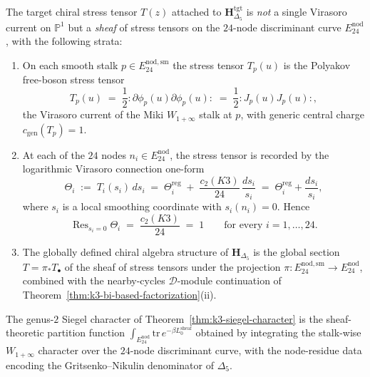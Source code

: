 \begin{conjecture}
\label{thm:k3-stress-tensor-sheaf}
\ClaimStatusConjectured
The target chiral stress tensor $T(z)$ attached to
$\mathbf{H}_{\Delta_5}^{\mathrm{tgt}}$ is \emph{not} a
single Virasoro current on $\mathbb{P}^1$ but a \emph{sheaf} of stress tensors
on the $24$-node discriminant curve $E^{\mathrm{nod}}_{24}$, with the
following strata:
\begin{enumerate}[label=\textup{(\roman*)}]
\item On each smooth stalk $p\in E^{\mathrm{nod,sm}}_{24}$ the stress tensor
 $T_p(u)$ is the Polyakov free-boson stress tensor
 \[
 T_p(u)
 \;=\;
 \frac{1}{2}{:}\partial\phi_p(u)\partial\phi_p(u){:}
 \;=\;
 \frac{1}{2}{:}J_p(u)J_p(u){:},
 \]
 the Virasoro current of the Miki $W_{1+\infty}$ stalk at $p$, with generic
 central charge $c_{\mathrm{gen}}(T_p) = 1$.
\item At each of the $24$ nodes $n_i\in E^{\mathrm{nod}}_{24}$, the stress
 tensor is recorded by the logarithmic Virasoro connection one-form
 \[
 \Theta_i
 \;:=\;
 T_i(s_i)\,ds_i
 \;=\;
 \Theta_i^{\mathrm{reg}}
 \;+\;
 \frac{c_2(K3)}{24}\,\frac{ds_i}{s_i}
 \;=\;
 \Theta_i^{\mathrm{reg}} + \frac{ds_i}{s_i},
 \]
 where $s_i$ is a local smoothing coordinate with $s_i(n_i)=0$. Hence
 \[
 \operatorname{Res}_{s_i=0}\Theta_i
 \;=\;
 \frac{c_2(K3)}{24}
 \;=\;
 1
 \qquad
 \text{for every } i=1,\dots,24.
 \]
\item The globally defined chiral algebra structure of $\mathbf{H}_{\Delta_5}$
 is the global section $T = \pi_*T_\bullet$ of the sheaf of stress tensors
 under the projection $\pi\colon E^{\mathrm{nod,sm}}_{24}\to E^{\mathrm{nod}}_{24}$,
 combined with the nearby-cycles $\mathcal{D}$-module continuation of
 Theorem~\ref{thm:k3-bi-based-factorization}(ii).
\end{enumerate}
The genus-$2$ Siegel character of Theorem~\ref{thm:k3-siegel-character} is the
sheaf-theoretic partition function
$\int_{E^{\mathrm{nod}}_{24}}\mathrm{tr}\,e^{-\beta L_0^{\mathrm{sheaf}}}$
obtained by integrating the stalk-wise $W_{1+\infty}$ character over the
$24$-node discriminant curve, with the node-residue data encoding the
Gritsenko--Nikulin denominator of $\Delta_5$.
\end{conjecture}

